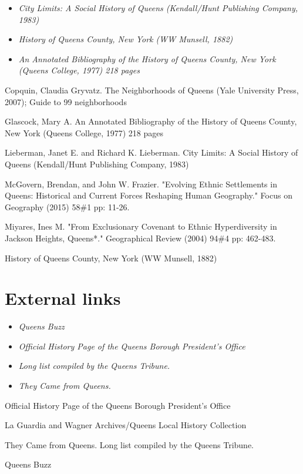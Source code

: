 \begin{itemize}
\item
  \emph{City Limits: A Social History of Queens (Kendall/Hunt Publishing
  Company, 1983)}
\item
  \emph{History of Queens County, New York (WW Munsell, 1882)}
\item
  \emph{An Annotated Bibliography of the History of Queens County, New
  York (Queens College, 1977) 218 pages}
\end{itemize}

Copquin, Claudia Gryvatz. The Neighborhoods of Queens (Yale University
Press, 2007); Guide to 99 neighborhoods

Glascock, Mary A. An Annotated Bibliography of the History of Queens
County, New York (Queens College, 1977) 218 pages

Lieberman, Janet E. and Richard K. Lieberman. City Limits: A Social
History of Queens (Kendall/Hunt Publishing Company, 1983)

McGovern, Brendan, and John W. Frazier. "Evolving Ethnic Settlements in
Queens: Historical and Current Forces Reshaping Human Geography." Focus
on Geography (2015) 58\#1 pp: 11-26.

Miyares, Ines M. "From Exclusionary Covenant to Ethnic Hyperdiversity in
Jackson Heights, Queens*." Geographical Review (2004) 94\#4 pp: 462-483.

History of Queens County, New York (WW Munsell, 1882)

\section{External links}\label{external-links}

\begin{itemize}
\item
  \emph{Queens Buzz}
\item
  \emph{Official History Page of the Queens Borough President's Office}
\item
  \emph{Long list compiled by the Queens Tribune.}
\item
  \emph{They Came from Queens.}
\end{itemize}

Official History Page of the Queens Borough President's Office

La Guardia and Wagner Archives/Queens Local History Collection

They Came from Queens. Long list compiled by the Queens Tribune.

Queens Buzz
